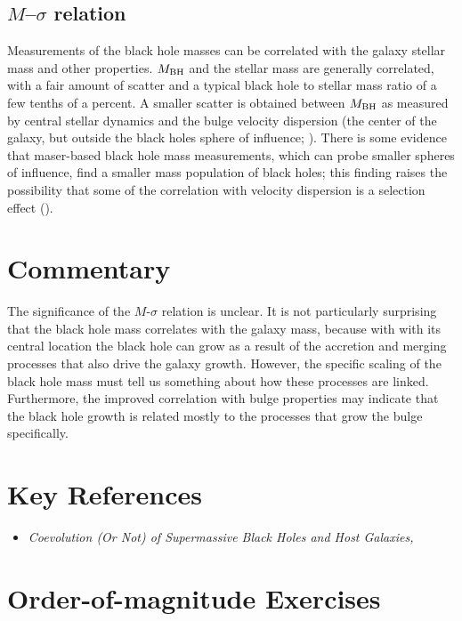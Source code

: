 \subsection{$M$--$\sigma$ relation}

Measurements of the black hole masses can be correlated with the
galaxy stellar mass and other properties. $M_{\rm BH}$ and the stellar
mass are generally correlated, with a fair amount of scatter and a
typical black hole to stellar mass ratio of a few tenths of a
percent. A smaller scatter is obtained between $M_{\rm BH}$ as
measured by central stellar dynamics and the bulge velocity dispersion
(the center of the galaxy, but outside the black holes sphere of
influence; \citealt{ferrarese00a, tremaine02a}). There is some
evidence that maser-based black hole mass measurements, which can
probe smaller spheres of influence, find a smaller mass population of
black holes; this finding raises the possibility that some of the
correlation with velocity dispersion is a selection effect
(\citealt{greene16a}).

\section{Commentary}

The significance of the $M$-$\sigma$ relation is unclear. It is not
particularly surprising that the black hole mass correlates with the
galaxy mass, because with with its central location the black hole can
grow as a result of the accretion and merging processes that also
drive the galaxy growth. However, the specific scaling of the black
hole mass must tell us something about how these processes are
linked. Furthermore, the improved correlation with bulge properties
may indicate that the black hole growth is related mostly to the
processes that grow the bulge specifically.

\section{Key References}

\begin{itemize}
  \item {\it Coevolution (Or Not) of Supermassive Black Holes and Host
  Galaxies, \citet{kormendy13a}}
\end{itemize}

\citet{gunn06a}

\section{Order-of-magnitude Exercises}

